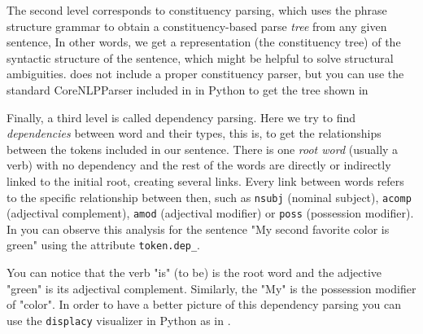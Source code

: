 
The second level corresponds to constituency parsing, which uses the phrase structure grammar to obtain a constituency-based parse \textit{tree} from any given sentence, In other words, we get a representation (the constituency tree) of the syntactic structure of the sentence, which might be helpful to solve structural ambiguities.  does not include a proper constituency parser, but you can use the standard CoreNLPParser included in  in Python to get the tree shown in 


Finally, a third level is called dependency parsing. Here we try to find \textit{dependencies} between word and their types, this is, to get the relationships between the tokens included in our sentence. There is one \textit{root word} (usually a verb) with no dependency and the rest of the words are directly or indirectly linked to the initial root, creating several links. Every link between words refers to the specific relationship between then, such as \texttt{nsubj} (nominal subject), \texttt{acomp} (adjectival complement), \texttt{amod} (adjectival modifier) or \texttt{poss} (possession modifier). In  you can observe this analysis for the sentence "My second favorite color is green" using the attribute \verb|token.dep_|.


You can notice that the verb "is" (to be) is the root word and the adjective "green" is its adjectival complement. Similarly, the "My" is the possession modifier of "color". In order to have a better picture of this dependency parsing you can use the \texttt{displacy} visualizer in Python as in .


